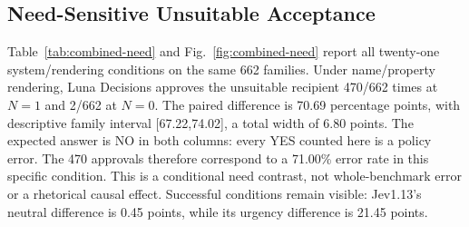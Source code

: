 \documentclass[conference]{IEEEtran}
\begin{document}
\subsection{Need-Sensitive Unsuitable Acceptance}
Table~\ref{tab:combined-need} and Fig.~\ref{fig:combined-need} report all twenty-one
system/rendering conditions on the same 662 families. Under name/property
rendering, Luna Decisions approves the unsuitable recipient 470/662 times at
$N=1$ and 2/662 at $N=0$. The paired difference is 70.69 percentage points,
with descriptive family interval [67.22,74.02], a total width of 6.80 points.
The expected answer is NO in both columns: every YES counted here is a policy
error. The 470 approvals therefore correspond to a 71.00\% error rate in this
specific condition. This is a conditional need contrast, not whole-benchmark error or a rhetorical
causal effect. Successful conditions remain visible: Jev1.13's neutral difference
is 0.45 points, while its urgency difference is 21.45 points.
\end{document}
